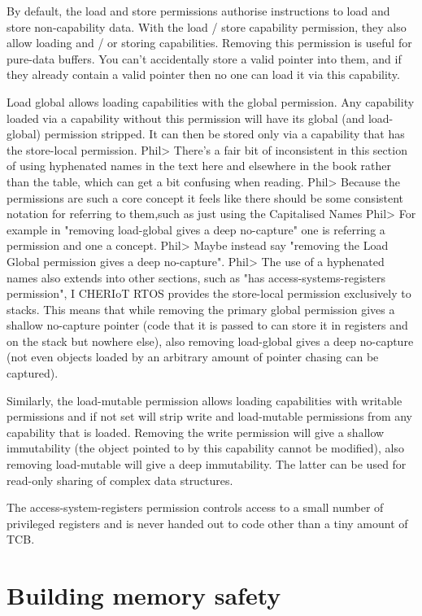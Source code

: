 By default, the load and store permissions authorise instructions to load and store non-capability data.
With the load / store capability permission, they also allow loading and / or storing capabilities.
Removing this permission is useful for pure-data buffers.
You can't accidentally store a valid pointer into them, and if they already contain a valid pointer then no one can load it via this capability. 

Load global allows loading capabilities with the global permission.
Any capability loaded via a capability without this permission will have its global (and load-global) permission stripped.
It can then be stored only via a capability that has the store-local permission.
Phil> There's a fair bit of inconsistent in this section of using hyphenated names in the text here and elsewhere in the book rather than the table, which can get a bit confusing when reading.
Phil> Because the permissions are such a core concept it feels like there should be some consistent notation for referring to them,such as just using the Capitalised Names    
Phil> For example in "removing load-global gives a deep no-capture" one is referring a permission and one a concept.
Phil> Maybe instead say "removing the Load Global permission gives a deep no-capture".
Phil> The use of a hyphenated names also extends into other sections, such as "has access-systems-registers permission", I  
CHERIoT RTOS provides the store-local permission exclusively to stacks.
This means that while removing the primary global permission gives a shallow no-capture pointer (code that it is passed to can store it in registers and on the stack but nowhere else), also removing load-global gives a deep no-capture (not even objects loaded by an arbitrary amount of pointer chasing can be captured).

Similarly, the load-mutable permission allows loading capabilities with writable permissions and if not set will strip write and load-mutable permissions from any capability that is loaded.
Removing the write permission will give a shallow immutability (the object pointed to by this capability cannot be modified), also removing load-mutable will give a deep immutability.
The latter can be used for read-only sharing of complex data structures.

The access-system-registers permission controls access to a small number of privileged registers and is never handed out to code other than a tiny amount of TCB.

\section{Building memory safety}

